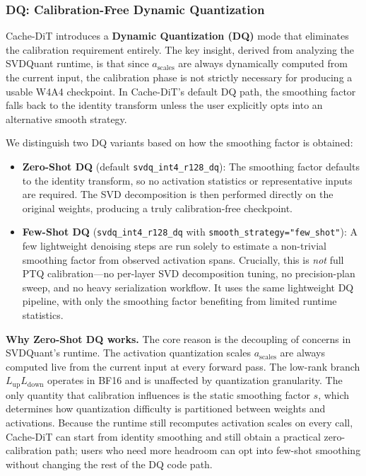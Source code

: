 \documentclass[10pt]{article}
\begin{document}
\subsubsection{DQ: Calibration-Free Dynamic Quantization}

Cache-DiT introduces a \textbf{Dynamic Quantization (DQ)} mode that eliminates the calibration requirement entirely. The key insight, derived from analyzing the SVDQuant runtime, is that since $a_{\text{scales}}$ are always dynamically computed from the current input, the calibration phase is not strictly necessary for producing a usable W4A4 checkpoint. In Cache-DiT's default DQ path, the smoothing factor falls back to the identity transform unless the user explicitly opts into an alternative smooth strategy.

We distinguish two DQ variants based on how the smoothing factor is obtained:

\begin{itemize}
    \item \textbf{Zero-Shot DQ} (default \texttt{svdq\_int4\_r128\_dq}): The smoothing factor defaults to the identity transform, so no activation statistics or representative inputs are required. The SVD decomposition is then performed directly on the original weights, producing a truly calibration-free checkpoint.
    \item \textbf{Few-Shot DQ} (\texttt{svdq\_int4\_r128\_dq} with \texttt{smooth\_strategy="few\_shot"}): A few lightweight denoising steps are run solely to estimate a non-trivial smoothing factor from observed activation spans. Crucially, this is \textit{not} full PTQ calibration---no per-layer SVD decomposition tuning, no precision-plan sweep, and no heavy serialization workflow. It uses the same lightweight DQ pipeline, with only the smoothing factor benefiting from limited runtime statistics.
\end{itemize}

\textbf{Why Zero-Shot DQ works.} The core reason is the decoupling of concerns in SVDQuant's runtime. The activation quantization scales $a_{\text{scales}}$ are always computed live from the current input at every forward pass. The low-rank branch $L_{\text{up}} L_{\text{down}}$ operates in BF16 and is unaffected by quantization granularity. The only quantity that calibration influences is the static smoothing factor $s$, which determines how quantization difficulty is partitioned between weights and activations. Because the runtime still recomputes activation scales on every call, Cache-DiT can start from identity smoothing and still obtain a practical zero-calibration path; users who need more headroom can opt into few-shot smoothing without changing the rest of the DQ code path.
\end{document}
